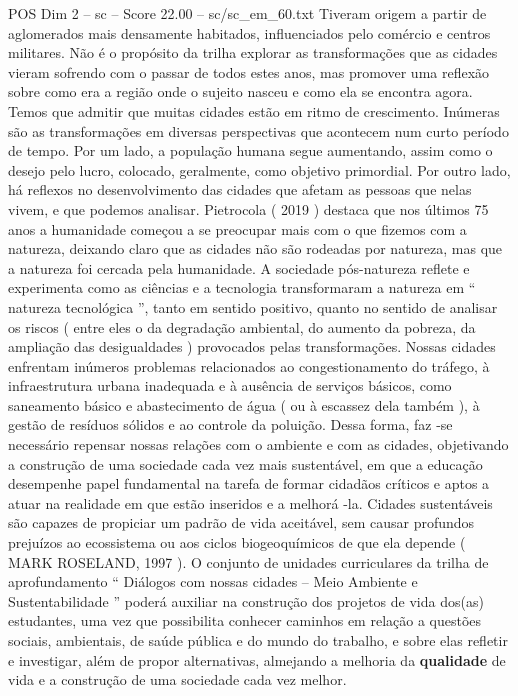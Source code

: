 \begin{textsample}{POS Dim 2 – sc – Score 22.00 – sc/sc\_em\_60.txt}
Tiveram origem a partir de aglomerados mais densamente habitados, influenciados pelo comércio e centros militares.
Não é o propósito da trilha explorar as transformações que as cidades vieram sofrendo com o passar de todos estes anos, mas promover uma reflexão sobre como era a região onde o sujeito nasceu e como ela se encontra agora.
Temos que admitir que muitas cidades estão em ritmo de crescimento.
Inúmeras são as transformações em diversas perspectivas que acontecem num curto período de tempo.
Por um lado, a população humana segue aumentando, assim como o desejo pelo lucro, colocado, geralmente, como objetivo primordial.
Por outro lado, há reflexos no desenvolvimento das cidades que afetam as pessoas que nelas vivem, e que podemos analisar.
Pietrocola ( 2019 ) destaca que nos últimos 75 anos a humanidade começou a se preocupar mais com o que fizemos com a natureza, deixando claro que as cidades não são rodeadas por natureza, mas que a natureza foi cercada pela humanidade.
A sociedade pós-natureza reflete e experimenta como as ciências e a tecnologia transformaram a natureza em “ natureza tecnológica ”, tanto em sentido positivo, quanto no sentido de analisar os riscos ( entre eles o da degradação ambiental, do aumento da pobreza, da ampliação das desigualdades ) provocados pelas transformações.
Nossas cidades enfrentam inúmeros problemas relacionados ao congestionamento do tráfego, à infraestrutura urbana inadequada e à ausência de serviços básicos, como saneamento básico e abastecimento de água ( ou à escassez dela também ), à gestão de resíduos sólidos e ao controle da poluição.
Dessa forma, faz -se necessário repensar nossas relações com o ambiente e com as cidades, objetivando a construção de uma sociedade cada vez mais sustentável, em que a educação desempenhe papel fundamental na tarefa de formar cidadãos críticos e aptos a atuar na realidade em que estão inseridos e a melhorá -la.
Cidades sustentáveis são capazes de propiciar um padrão de vida aceitável, sem causar profundos prejuízos ao ecossistema ou aos ciclos biogeoquímicos de que ela depende ( MARK ROSELAND, 1997 ).
O conjunto de unidades curriculares da trilha de aprofundamento “ Diálogos com nossas cidades – Meio Ambiente e Sustentabilidade ” poderá auxiliar na construção dos projetos de vida dos(as) estudantes, uma vez que possibilita conhecer caminhos em relação a questões sociais, ambientais, de saúde pública e do mundo do trabalho, e sobre elas refletir e investigar, além de propor alternativas, almejando a melhoria da \textbf{qualidade} de vida e a construção de uma sociedade cada vez melhor.

\end{textsample}
